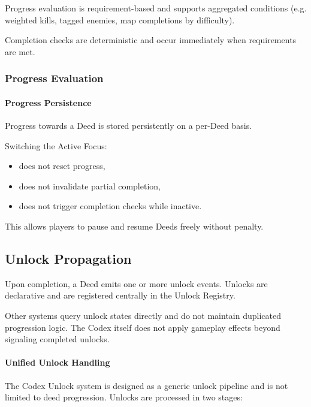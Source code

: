 Progress evaluation is requirement-based and supports aggregated conditions
(e.g. weighted kills, tagged enemies, map completions by difficulty).

Completion checks are deterministic and occur immediately when requirements are met.

\subsubsection{Progress Evaluation}

\paragraph{Progress Persistence}

Progress towards a Deed is stored persistently on a per-Deed basis.

Switching the Active Focus:
\begin{itemize}
	\item does not reset progress,
	\item does not invalidate partial completion,
	\item does not trigger completion checks while inactive.
\end{itemize}

This allows players to pause and resume Deeds freely without penalty.

\subsection{Unlock Propagation}

Upon completion, a Deed emits one or more unlock events.
Unlocks are declarative and are registered centrally in the Unlock Registry.

Other systems query unlock states directly and do not maintain duplicated progression logic.
The Codex itself does not apply gameplay effects beyond signaling completed unlocks.

\paragraph{Unified Unlock Handling}
The Codex Unlock system is designed as a generic unlock pipeline and is not limited to deed progression.
Unlocks are processed in two stages:

